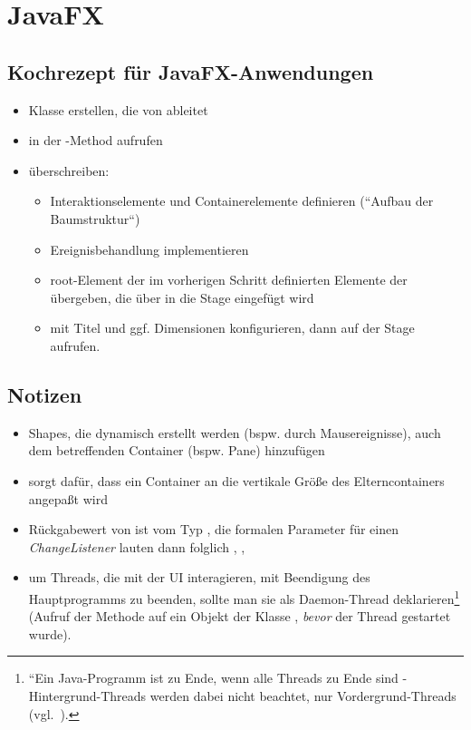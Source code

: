 \section{JavaFX}


\subsection{Kochrezept für JavaFX-Anwendungen}

\begin{itemize}
    \item Klasse erstellen, die von  ableitet
    \item in der -Method  aufrufen
    \item {} überschreiben:
    \begin{itemize}
        \item Interaktionselemente und Containerelemente definieren (``Aufbau der Baumstruktur``)
        \item Ereignisbehandlung implementieren
        \item root-Element der im vorherigen Schritt definierten Elemente der  übergeben, die über  in die Stage eingefügt wird
        \item {} mit Titel und ggf. Dimensionen konfigurieren, dann  auf der Stage aufrufen.
    \end{itemize}
\end{itemize}

\subsection*{Notizen }

\begin{itemize}
    \item Shapes, die dynamisch erstellt werden (bspw. durch Mausereignisse), auch dem betreffenden Container
    (bspw. Pane) hinzufügen
    \item {} sorgt dafür, dass ein Container an die vertikale Größe des Elterncontainers angepaßt wird
    \item Rückgabewert von  ist vom Typ , die formalen Parameter für einen \textit{ChangeListener} lauten dann folglich , , 
    \item um Threads, die mit der UI interagieren, mit Beendigung des Hauptprogramms zu beenden, sollte man sie als Daemon-Thread deklarieren\footnote{
        ``Ein Java-Programm ist zu Ende, wenn alle Threads zu Ende sind - Hintergrund-Threads werden dabei nicht beachtet, nur Vordergrund-Threads (vgl.~\cite[89]{Oec22}).
    } (Aufruf der Methode  auf ein Objekt der Klasse , \textit{bevor} der Thread gestartet wurde).\\
\end{itemize}


